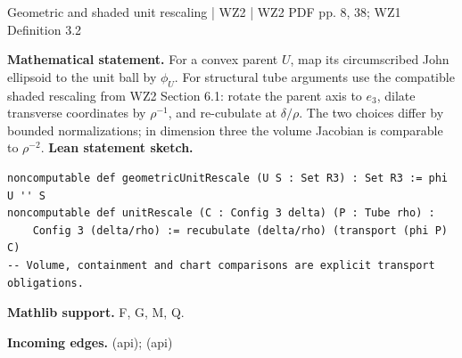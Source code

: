 \documentclass[10pt,a4paper]{article}
\newcommand{\nodecard}[1]{\hyperlink{node-#1}{\texttt{\detokenize{#1}}}}
\begin{document}
\begin{minipage}{\linewidth}
\hypertarget{node-W2Unit}{}
\begin{tcolorbox}[colback=white,colframe=setupfg,colbacktitle=setupbg,coltitle=ink,boxrule=0.45pt,arc=1.6mm,left=3mm,right=3mm,top=2mm,bottom=2mm,title={\sffamily\bfseries WZ2 Definition 2.8 / Sec. 6.1 \hfill \texttt{W2Unit}}]
{\sffamily\small\color{muted}Geometric and shaded unit rescaling | WZ2 | WZ2 PDF pp. 8, 38; WZ1 Definition 3.2}\par
\textbf{Mathematical statement.} For a convex parent $U$, map its circumscribed John ellipsoid to the unit ball by $\phi_U$.
For structural tube arguments use the compatible shaded rescaling from WZ2 Section 6.1: rotate the parent axis to $e_3$, dilate transverse coordinates by $\rho^{-1}$, and re-cubulate at $\delta/\rho$.
The two choices differ by bounded normalizations; in dimension three the volume Jacobian is comparable to $\rho^{-2}$.
\smallskip\textbf{Lean statement sketch.}
\begin{Verbatim}[fontsize=\small,breaklines=true,breakanywhere=true,tabsize=2]
noncomputable def geometricUnitRescale (U S : Set R3) : Set R3 := phi U '' S
noncomputable def unitRescale (C : Config 3 delta) (P : Tube rho) :
    Config 3 (delta/rho) := recubulate (delta/rho) (transport (phi P) C)
-- Volume, containment and chart comparisons are explicit transport obligations.
\end{Verbatim}
{\footnotesize\textbf{Mathlib support.} F, G, M, Q.\par
\textbf{Incoming edges.} \nodecard{Iaffine} (api); \nodecard{Icover} (api)\par}

\end{tcolorbox}\end{minipage}\par\medskip
\end{document}
